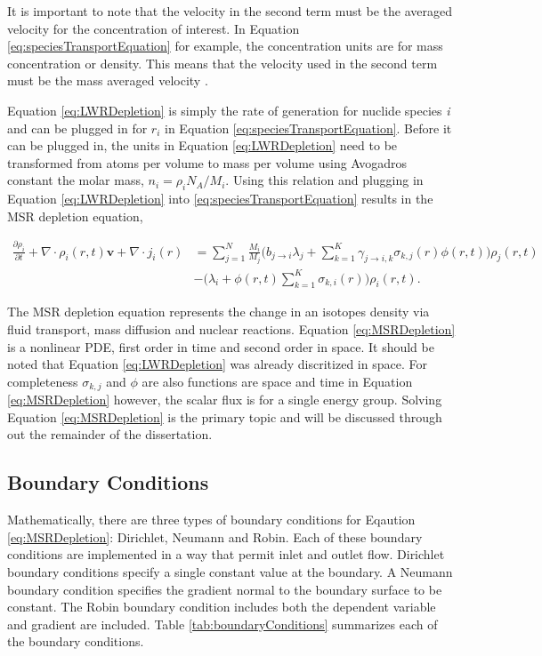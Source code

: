 \noindent It is important to note that the velocity in the second term must be the averaged velocity for the concentration of interest. In Equation \ref{eq:speciesTransportEquation} for example, the concentration units are for mass concentration or density. This means that the velocity used in the second term must be the mass averaged velocity \cite{zackThesis}. 

Equation \ref{eq:LWRDepletion} is simply the rate of generation for nuclide species \textit{i} and can be plugged in for $r_{i}$ in Equation \ref{eq:speciesTransportEquation}. Before it can be plugged in, the units in Equation \ref{eq:LWRDepletion} need to be transformed from atoms per volume to mass per volume using Avogadros constant the molar mass, $n_{i} = \rho_{i}N_{A} / M_{i}$. Using this relation and plugging in Equation \ref{eq:LWRDepletion} into \ref{eq:speciesTransportEquation} results in the MSR depletion equation,


\begin{equation}
\begin{split}
    \frac{\partial \rho_{i}}{\partial t}
    + \nabla \cdot \rho_{i}(r,t)\boldsymbol{v}
    + \nabla \cdot j_{i}(r)
    &=
    \sum_{j=1}^{N}\frac{M_{i}}{M_{j}}\bigg(b_{j\rightarrow i}\lambda_{j} + 
    \sum_{k=1}^{K}\gamma_{j\rightarrow i,k}\sigma_{k,j}(r)\phi(r,t) \bigg)\rho_{j}(r,t)\\
    &- \bigg(\lambda_{i} + \phi(r,t)\sum_{k=1}^{K} \sigma_{k,i}(r)\bigg)\rho_{i}(r,t).
\end{split}
    \label{eq:MSRDepletion}
\end{equation}

The MSR depletion equation represents the change in an isotopes density via fluid transport, mass diffusion and nuclear reactions. Equation \ref{eq:MSRDepletion} is a nonlinear PDE, first order in time and second order in space. It should be noted that Equation \ref{eq:LWRDepletion} was already discritized in space. For completeness $\sigma_{k,j}$ and $\phi$ are also functions are space and time in Equation \ref{eq:MSRDepletion} however, the scalar flux is for a single energy group. Solving Equation \ref{eq:MSRDepletion} is the primary topic and will be discussed through out the remainder of the dissertation.

\subsection{Boundary Conditions}
Mathematically, there are three types of boundary conditions for Eqaution \ref{eq:MSRDepletion}: Dirichlet, Neumann and Robin. Each of these boundary conditions are implemented in a way that permit inlet and outlet flow. Dirichlet boundary conditions specify a single constant value at the boundary. A Neumann boundary condition specifies the gradient normal to the boundary surface to be constant. The Robin boundary condition includes both the dependent variable and gradient are included. Table \ref{tab:boundaryConditions} summarizes each of the boundary conditions.


